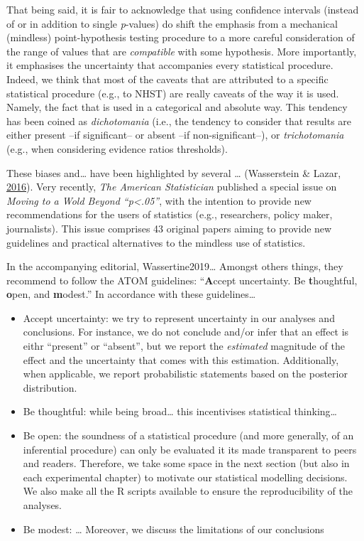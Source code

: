 \documentclass[a4paper,12pt,twoside,openright,oldfontcommands]{memoir}
\begin{document}
That being said, it is fair to acknowledge that using confidence
intervals (instead of or in addition to single \emph{p}-values) do shift
the emphasis from a mechanical (mindless) point-hypothesis testing
procedure to a more careful consideration of the range of values that
are \emph{compatible} with some hypothesis. More importantly, it
emphasises the uncertainty that accompanies every statistical procedure.
Indeed, we think that most of the caveats that are attributed to a
specific statistical procedure (e.g., to NHST) are really caveats of the
way it is used. Namely, the fact that is used in a categorical and
absolute way. This tendency has been coined as \emph{dichotomania}
(i.e., the tendency to consider that results are either present --if
significant-- or absent --if non-significant--), or \emph{trichotomania}
(e.g., when considering evidence ratios thresholds).

These biases and\ldots{} have been highlighted by several \ldots{}
(Wasserstein \& Lazar,
\protect\hyperlink{ref-wasserstein_asas_2016}{2016}). Very recently,
\emph{The American Statistician} published a special issue on
\emph{Moving to a Wold Beyond ``p\textless{}.05''}, with the intention
to provide new recommendations for the users of statistics (e.g.,
researchers, policy maker, journalists). This issue comprises 43
original papers aiming to provide new guidelines and practical
alternatives to the mindless use of statistics.

In the accompanying editorial, Wassertine2019\ldots{} Amongst others
things, they recommend to follow the ATOM guidelines: ``\textbf{A}ccept
uncertainty. Be \textbf{t}houghtful, \textbf{o}pen, and
\textbf{m}odest.'' In accordance with these guidelines\ldots{}

\begin{itemize}
\item
  Accept uncertainty: we try to represent uncertainty in our analyses
  and conclusions. For instance, we do not conclude and/or infer that an
  effect is eithr ``present'' or ``absent'', but we report the
  \emph{estimated} magnitude of the effect and the uncertainty that
  comes with this estimation. Additionally, when applicable, we report
  probabilistic statements based on the posterior distribution.
\item
  Be thoughtful: while being broad\ldots{} this incentivises statistical
  thinking\ldots{}
\item
  Be open: the soundness of a statistical procedure (and more generally,
  of an inferential procedure) can only be evaluated it its made
  transparent to peers and readers. Therefore, we take some space in the
  next section (but also in each experimental chapter) to motivate our
  statistical modelling decisions. We also make all the R scripts
  available to ensure the reproducibility of the analyses.
\item
  Be modest: \ldots{} Moreover, we discuss the limitations of our
  conclusions
\end{itemize}
\end{document}
